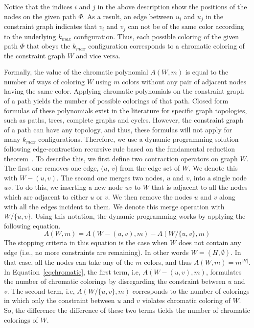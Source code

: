 \documentclass{ws-procs11x85}
\begin{document}
Notice that the indices $i$ and $j$ in the above description show the
positions of the nodes on the given path $\Phi$.  As a result, an edge
between $u_i$ and $u_j$ in the constraint graph indicates that $v_i$
and $v_j$ can not be of the same color according to the underlying
$k_{max}$ configuration. Thus, each possible coloring of the given
path $\Phi$ that obeys the $k_{max}$ configuration corresponds to a
chromatic coloring of the constraint graph $W$ and vice versa.


Formally, the value of the chromatic polynomial $A(W, m)$ is equal to
the number of ways of coloring $W$ using $m$ colors without any pair
of adjacent nodes having the same color.  Applying chromatic
polynomials on the constraint graph of a path yields the number of
possible colorings of that path. Closed form formulas of these
polynomials exist in the literature for specific graph topologies,
such as paths, trees, complete graphs and cycles. However, the
constraint graph of a path can have any topology, and thus, these
formulas will not apply for many $k_{max}$ configurations. Therefore,
we use a dynamic programming solution following edge-contraction
recursive rule based on the fundamental reduction theorem~\cite{dong}.
To describe this, we first define two contraction operators on graph
$W$. The first one removes one edge, ($u$, $v$) from the edge set of
$W$. We denote this with $W - (u, v)$. The second one merges two
nodes, $u$ and $v$, into a single node $uv$. To do this, we inserting
a new node $uv$ to $W$ that is adjacent to all the nodes which are
adjacent to either $u$ or $v$. We then remove the nodes $u$ and $v$
along with all the edges incident to them. We denote this merge
operation with $W / \{u, v\}$. Using this notation, the dynamic
programming works by applying the following equation.
\begin{equation}
A(W, m) = A(W - (u, v), m) - A(W / \{u, v\}, m)
\label{eqchromatic}
\end{equation}
The stopping criteria in this equation is the case when $W$ does not
contain any edge (i.e., no more constraints are remaining). In other
words $W = (H, \emptyset)$. In that case, all the nodes can take any
of the $m$ colors, and thus $A(W, m) = m^{|H|}$.  In
Equation~\ref{eqchromatic}, the first term, i.e, $A(W - (u, v), m)$,
formulates the number of chromatic colorings by disregarding the
constraint between $u$ and $v$. The second term, i.e, $A(W / \{u, v\},
m)$ corresponds to the number of colorings in which only the
constraint between $u$ and $v$ violates chromatic coloring of $W$. So,
the difference the difference of these two terms tields the number of
chromatic colorings of $W$.
\end{document}
